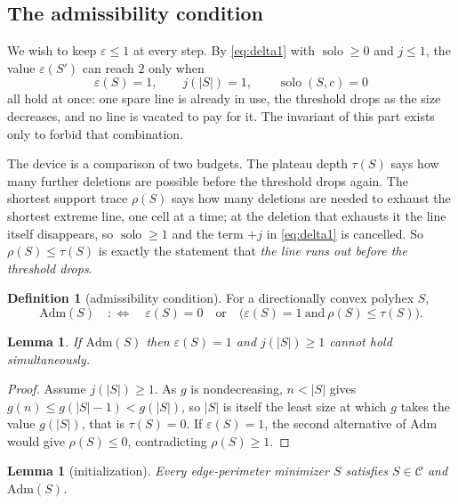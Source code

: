 \documentclass[11pt]{article}
\theoremstyle{plain}
\newtheorem{lemma}[theorem]{Lemma}
\theoremstyle{definition}
\newtheorem{definition}[theorem]{Definition}
\theoremstyle{remark}
\DeclareMathOperator{\solo}{solo}
\newcommand{\Adm}{\mathrm{Adm}}
\begin{document}
\subsection{The admissibility condition}\label{sec:adm}

We wish to keep \(\varepsilon\le1\) at every step. By \eqref{eq:delta1} with
\(\solo\ge0\) and \(j\le1\), the value \(\varepsilon(S')\) can reach \(2\) only when
\[
   \varepsilon(S)=1,\qquad j(|S|)=1,\qquad \solo(S,c)=0
\]
all hold at once: one spare line is already in use, the threshold drops as the size
decreases, and no line is vacated to pay for it. The invariant of this part exists only to
forbid that combination.

The device is a comparison of two budgets. The plateau depth \(\tau(S)\) says how many
further deletions are possible before the threshold drops again. The shortest support trace
\(\rho(S)\) says how many deletions are needed to exhaust the shortest extreme line, one
cell at a time; at the deletion that exhausts it the line itself disappears, so
\(\solo\ge1\) and the term \(+j\) in \eqref{eq:delta1} is cancelled. So
\(\rho(S)\le\tau(S)\) is exactly the statement that \emph{the line runs out before the
threshold drops}.

\begin{definition}[admissibility condition]\label{def:adm}
For a directionally convex polyhex \(S\),
\[
   \Adm(S)\quad:\Longleftrightarrow\quad
   \varepsilon(S)=0\quad\text{or}\quad\bigl(\varepsilon(S)=1\ \text{and}\ \rho(S)\le\tau(S)\bigr).
\]
\end{definition}

\begin{lemma}\label{lem:admjump}
If \(\Adm(S)\) then \(\varepsilon(S)=1\) and \(j(|S|)\ge1\) cannot hold simultaneously.
\end{lemma}

\begin{proof}
Assume \(j(|S|)\ge1\). As \(g\) is nondecreasing, \(n<|S|\) gives
\(g(n)\le g(|S|-1)<g(|S|)\), so \(|S|\) is itself the least size at which \(g\) takes the
value \(g(|S|)\), that is \(\tau(S)=0\). If \(\varepsilon(S)=1\), the second alternative of
\(\Adm\) would give \(\rho(S)\le0\), contradicting \(\rho(S)\ge1\).
\end{proof}

\begin{lemma}[initialization]\label{lem:init}
Every edge-perimeter minimizer \(S\) satisfies \(S\in\mathcal{C}\) and \(\Adm(S)\).
\end{lemma}
\end{document}
